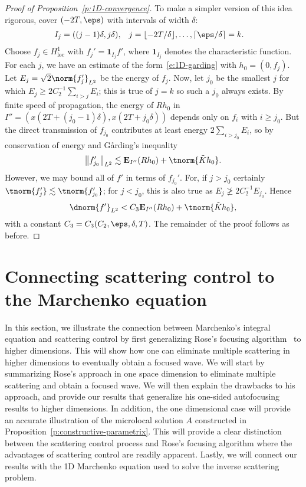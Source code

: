 \documentclass[10pt]{article}
\theoremstyle{plain}
\theoremstyle{definition}
\theoremstyle{remark}
\numberwithin{theorem}{section}
\numberwithin{example}{section}
\numberwithin{equation}{section}
\numberwithin{figure}{section}
\newcommand\Loc{_{\text{loc}}}		%
\newcommand\En{\mathbf E}		%
\newcommand\Garding{G\aa{}rding}
\begin{document}
\begin{proof}[Proof of Proposition~\ref{p:1D-convergence}]
	To make a simpler version of this idea rigorous, cover $(-2T,\eps)$ with intervals of width $\delta$:
	\begin{align}
		I_j&=((j-1)\delta,j\delta), 
		&
		j&=\lfloor -2T/\delta\rfloor,\dotsc,\lceil \eps/\delta\rceil=k.
	\end{align}
	Choose $f_j\in H^1\Loc$ with $f_j'=\mathbf 1_{I_j}f'$, where $\mathbf 1_{I_j}$ denotes the characteristic function. For each $j$, we have an estimate of the form~\eqref{e:1D-garding} with $h_0=(0,f_j)$. Let $E_j=\sqrt 2\norm{f_j'}_{L^2}$ be the energy of $f_j$.
	Now, let $j_0$ be the smallest $j$ for which $E_j\geq 2C_2^{-1}\sum_{i>j}E_i$; this is true of $j=k$ so such a $j_0$ always exists. By finite speed of propagation, the energy of $Rh_0$ in $I'' = (x(2T+(j_0-1)\delta), x(2T+j_0\delta))$ depends only on $f_i$ with $i\geq j_0$. But the direct transmission of $f_{j_0}$ contributes at least energy $2\sum_{i>j_0} E_i$, so by conservation of energy and \Garding's inequality
	\begin{equation}
		\big\lVert{f_{j_0}'}\big\rVert_{L^2} \lesssim \En_{I''}(Rh_0)+\tnorm{\tilde K h_0}.
	\end{equation}
	However, we may bound all of $f'$ in terms of $f_{j_0}'$. For, if $j>j_0$ certainly $\tnorm{f_j'}\lesssim \tnorm{f_{j_0}'}$; for $j<j_0$, this is also true as $E_j\not\geq 2C_2^{-1}E_{j_0}$. Hence
	\begin{equation}
		\dnorm{f'}_{L^2} < C_3\En_{I''}(Rh_0)+\tnorm{\tilde K h_0},
	\end{equation}
	with a constant $C_3=C_3(C_2,\eps,\delta,T)$. The remainder of the proof follows as before.
\end{proof}




\section{Connecting scattering control to the Marchenko equation}
\label{s:marchenko}


In this section, we illustrate the connection between Marchenko's integral equation and scattering control by first generalizing Rose's focusing algorithm~\cite{Rose02} to higher dimensions. This will show how one can eliminate multiple scattering in higher dimensions to eventually obtain a focused wave. We will start by summarizing Rose's approach in one space dimension to eliminate multiple scattering and obtain a focused wave. We will then explain the drawbacks to his approach, and provide our results that generalize his one-sided autofocusing results to higher dimensions. In addition, the one dimensional case will provide an accurate illustration of the microlocal solution $A$ constructed in Proposition~\ref{p:constructive-parametrix}. This will provide a clear distinction between the scattering control process and Rose's focusing algorithm where the advantages of scattering control are readily apparent. Lastly, we will connect our results with the 1D Marchenko equation used to solve the inverse scattering problem.
\end{document}
